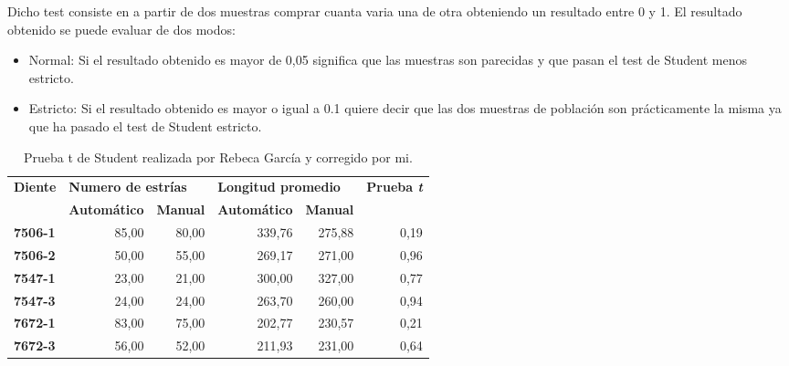 Dicho test consiste en a partir de dos muestras comprar cuanta varia una de otra obteniendo un resultado entre 0 y 1. El resultado obtenido se puede evaluar de dos modos:
\begin{itemize}
\item Normal: Si el resultado obtenido es mayor de 0,05 significa que las muestras son parecidas y que pasan el test de Student menos estricto.
\item Estricto: Si el resultado obtenido es mayor o igual a 0.1 quiere decir que las dos muestras de población son prácticamente la misma ya que ha pasado el test de Student estricto.
\end{itemize} 

\begin{table}[]
\centering
\caption{Prueba t de Student realizada por Rebeca García \cite{Rebeca:garcia} y corregido por mi.}
\label{tab:estud}
\begin{tabular}{@{} lrrrrr @{}}
\toprule
\multirow{2}{*}{\textbf{Diente}} & \multicolumn{2}{l}{\textbf{Numero de estrías}} & \multicolumn{2}{l}{\textbf{Longitud promedio}} & \multirow{2}{*}{\textbf{Prueba \textit{t}}} \\ \cline{2-5}
                                 & \textbf{Automático}      & \textbf{Manual}     & \textbf{Automático}      & \textbf{Manual}     &                                    \\ \midrule
\textbf{7506-1}                  & 85,00                    & 80,00               & 339,76                   & 275,88              & 0,19                               \\ 
\textbf{7506-2}                  & 50,00                    & 55,00               & 269,17                   & 271,00              & 0,96                               \\ 
\textbf{7547-1}                  & 23,00                    & 21,00               & 300,00                   & 327,00              & 0,77                               \\ 
\textbf{7547-3}                  & 24,00                    & 24,00               & 263,70                   & 260,00              & 0,94                               \\ 
\textbf{7672-1}                  & 83,00                    & 75,00               & 202,77                   & 230,57              & 0,21                               \\ 
\textbf{7672-3}                  & 56,00                    & 52,00               & 211,93                   & 231,00              & 0,64                               \\ 

\end{tabular}
\end{table}
